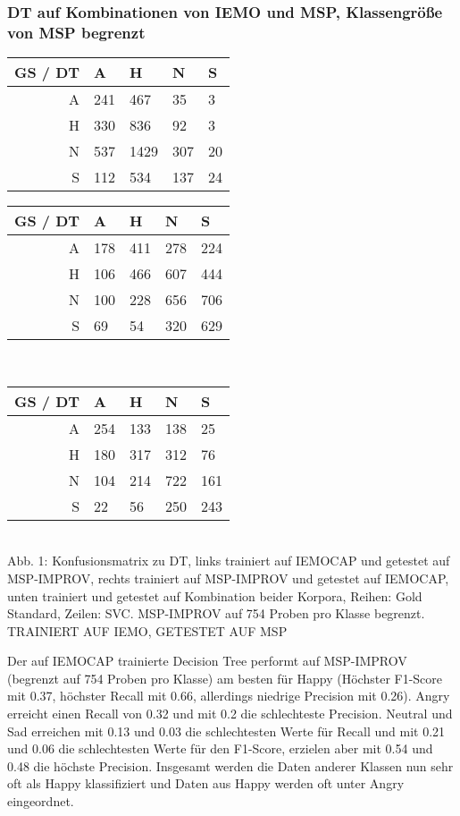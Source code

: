 \documentclass{article} %
\begin{document}
\subsubsection{DT auf Kombinationen von IEMO und MSP, Klassengröße von MSP begrenzt}
\begin{tabular}{|r|llll|}
\hline
GS / DT & A & H & N & S \\
\hline
A & 241 & 467 & 35 & 3 \\
H & 330 & 836 & 92 & 3 \\
N & 537 & 1429 & 307 & 20 \\
S & 112 & 534 & 137 & 24 \\
\hline
\end{tabular}
\begin{tabular}{|r|llll|}
\hline
GS / DT & A & H & N & S \\
\hline
A & 178 & 411 & 278 & 224 \\
H & 106 & 466 & 607 & 444 \\
N & 100 & 228 & 656 & 706 \\
S & 69 & 54 & 320 & 629 \\
\hline
\end{tabular} \\
\begin{tabular}{|r|llll|}
\hline
GS / DT & A & H & N & S \\
\hline
A & 254 & 133 & 138 & 25 \\
H & 180 & 317 & 312 & 76 \\
N & 104 & 214 & 722 & 161 \\
S & 22 & 56 & 250 & 243 \\
\hline
\end{tabular} \\

Abb. 1: Konfusionsmatrix zu DT, links trainiert auf IEMOCAP und getestet auf MSP-IMPROV, rechts trainiert auf MSP-IMPROV und getestet auf IEMOCAP, unten trainiert und getestet auf Kombination beider Korpora, Reihen: Gold Standard, Zeilen: SVC. MSP-IMPROV auf 754 Proben pro Klasse begrenzt. \\
TRAINIERT AUF IEMO, GETESTET AUF MSP

Der auf IEMOCAP trainierte Decision Tree performt auf MSP-IMPROV (begrenzt auf 754 Proben pro Klasse) am besten für Happy (Höchster F1-Score mit 0.37, höchster Recall mit 0.66, allerdings niedrige Precision mit 0.26). Angry erreicht einen Recall von 0.32 und mit 0.2 die schlechteste Precision. Neutral und Sad erreichen mit 0.13 und 0.03 die schlechtesten Werte für Recall und mit 0.21 und 0.06 die schlechtesten Werte für den F1-Score, erzielen aber mit 0.54 und 0.48 die höchste Precision. 
Insgesamt werden die Daten anderer Klassen nun sehr oft als Happy klassifiziert und Daten aus Happy werden oft unter Angry eingeordnet. 
\end{document}
